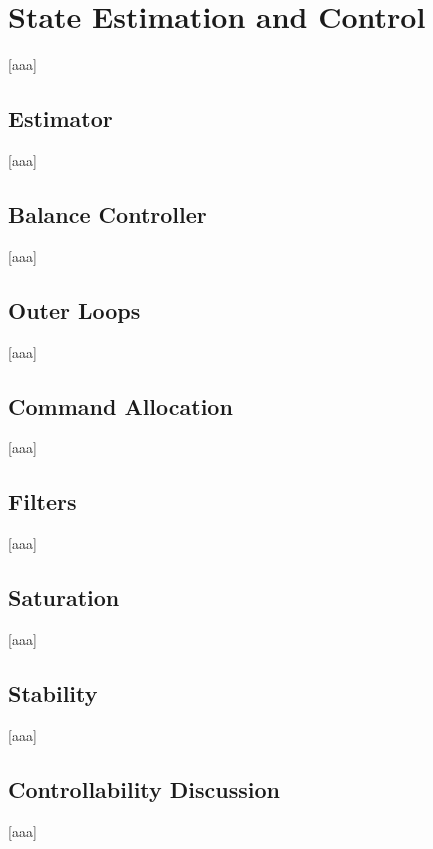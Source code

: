 \chapter{State Estimation and Control} \label{sec:State Estimation and Control}
    [aaa]

\section{Estimator} \label{sec:Estimator}
    [aaa]

\section{Balance Controller} \label{sec:Balance Controller}
    [aaa]

\section{Outer Loops} \label{sec:Outer Loops}
    [aaa]

\section{Command Allocation} \label{sec:Command Allocation}
    [aaa]

\section{Filters} \label{sec:Filters}
    [aaa]

\section{Saturation} \label{sec:Saturation}
    [aaa]

\section{Stability} \label{sec:Stability}
    [aaa]
    
\section{Controllability Discussion} \label{sec:Controllability Discussion}
    [aaa]
